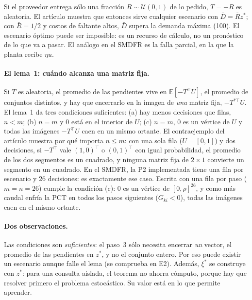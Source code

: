 \begin{ejemplo}
Si el proveedor entrega sólo una fracción $R\sim\mathcal U(0,1)$ de lo pedido, $T=-R$ es
aleatoria. El artículo muestra que entonces sirve cualquier escenario con $\bar D=\bar Rz^*$; con
$\bar R=1/2$ y costos de faltante altos, $\bar D$ supera la demanda máxima (100). El escenario
óptimo puede ser imposible: es un recurso de cálculo, no un pronóstico de lo que va a pasar. El
análogo en el SMDFR es la falla parcial, en la que la planta recibe $\eta u$.
\end{ejemplo}

\paragraph{El lema~1: cuándo alcanza una matriz fija.} Si $T$ es aleatoria, el promedio de las
pendientes vive en $\mathbb E[-T^\top U]$, el promedio de conjuntos distintos, y hay que encerrarlo
en la imagen de \emph{una} matriz fija, $-T^{*\top}U$. El lema~1 da tres condiciones suficientes:
(a) hay menos decisiones que filas, $n<m$; (b) $n=m$ y $0$ está en el interior de $U$; (c) $n=m$,
$0$ es un vértice de $U$ y todas las imágenes $-T^\top U$ caen en un mismo ortante. El
contraejemplo del artículo muestra por qué importa $n\le m$: con una sola fila ($U=[0,1]$) y dos
decisiones, si $-T^\top$ vale $(1,0)^\top$ o $(0,1)^\top$ con igual probabilidad, el promedio de
los dos segmentos es un cuadrado, y ninguna matriz fija de $2\times1$ convierte un segmento en un
cuadrado. En el SMDFR, la P2 implementada tiene una fila por escenario y 26 decisiones: es
exactamente ese caso. Escrita con una fila por paso ($m=n=26$) cumple la condición (c): $0$ es un
vértice de $[0,\rho]^{26}$, y como más caudal enfría la PCT en todos los pasos siguientes
($G_{ki}<0$), todas las imágenes caen en el mismo ortante.

\paragraph{Dos observaciones.} Las condiciones son \emph{suficientes}: el paso~3 sólo necesita
encerrar \emph{un} vector, el promedio de las pendientes en $z^*$, y no el conjunto entero. Por
eso puede existir un escenario aunque falle el lema (se comprueba en E2). Además, $\xi^*$ se
construye con $z^*$: para una consulta aislada, el teorema no ahorra cómputo, porque hay que
resolver primero el problema estocástico. Su valor está en lo que permite aprender.

